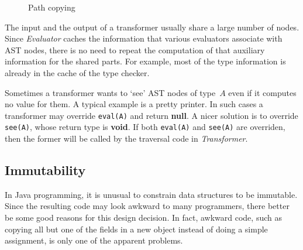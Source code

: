 \documentclass{llncs}
\newcommand{\jmlCode}{\lstinline[style=jml,basicstyle=\normalsize]}
\begin{document}
\begin{figure}\centering
{}
\caption{Path copying}\label{fig:path-copying}
\end{figure}

The input and the output of a transformer usually share a large
number of nodes. Since \textit{Evaluator} caches the information
that various evaluators associate with AST nodes, there is no
need to repeat the computation of that auxiliary information for
the shared parts. For example, most of the type information is
already in the cache of the type checker.

Sometimes a transformer wants to `see' AST nodes of type~$A$
even if it computes no value for them. A typical example is
a pretty printer. In such cases a transformer may override
\jmlCode|eval(A)| and return \textbf{null}. A nicer solution is
to override \jmlCode|see(A)|, whose return type is \textbf{void}.
If both \jmlCode|eval(A)| and \jmlCode|see(A)| are overriden,
then the former will be called by the traversal code in
\textit{Transformer}.


\subsection{Immutability}
\label{sec:design.immutability}

In Java programming, it is unusual to constrain data structures
to be immutable. Since the resulting code may look awkward to
many programmers, there better be some good reasons for this
design decision. In fact, awkward code, such as copying all but
one of the fields in a new object instead of doing a simple
assignment, is only one of the apparent problems.
\end{document}
